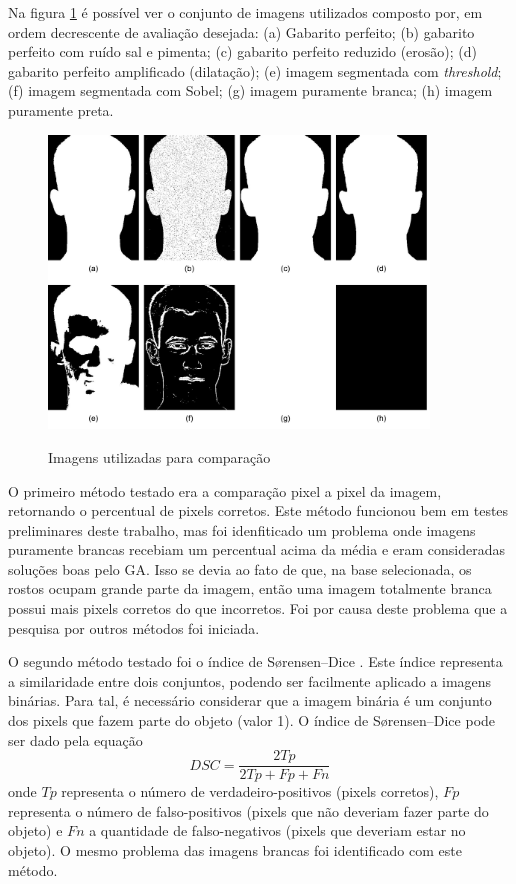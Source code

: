 \documentclass[12pt,oneside,a4paper,english,french,spanish,brazil,]{abntex2}
\begin{document}
Na figura \ref{fig:DES_Imagens_Teste} é possível ver o conjunto de imagens utilizados composto por, em ordem decrescente de avaliação desejada: (a) Gabarito perfeito; (b) gabarito perfeito com ruído sal e pimenta; (c) gabarito perfeito reduzido (erosão); (d) gabarito perfeito amplificado (dilatação); (e) imagem segmentada com \textit{threshold}; (f) imagem segmentada com Sobel; (g) imagem puramente branca; (h) imagem puramente preta.

\begin{figure}[ht]
\centering
\caption{Imagens utilizadas para comparação}
\includegraphics[width=0.9\textwidth]{imagens/DES_Imagens_Teste.pdf}
\sourceAuthor{}
\label{fig:DES_Imagens_Teste}
\end{figure}

O primeiro método testado era a comparação pixel a pixel da imagem, retornando o percentual de pixels corretos. Este método funcionou bem em testes preliminares deste trabalho, mas foi idenfiticado um problema onde imagens puramente brancas recebiam um percentual acima da média e eram consideradas soluções boas pelo GA. Isso se devia ao fato de que, na base selecionada, os rostos ocupam grande parte da imagem, então uma imagem totalmente branca possui mais pixels corretos do que incorretos. Foi por causa deste problema que a pesquisa por outros métodos foi iniciada.

O segundo método testado foi o índice de Sørensen–Dice \cite{sorensen:1948} \cite{dice:1945}. Este índice representa a similaridade entre dois conjuntos, podendo ser facilmente aplicado a imagens binárias. Para tal, é necessário considerar que a imagem binária é um conjunto dos pixels que fazem parte do objeto (valor 1). O índice de Sørensen–Dice pode ser dado pela equação \[DSC = \frac{2Tp}{2Tp + Fp + Fn}\] onde \(Tp\) representa o número de verdadeiro-positivos (pixels corretos), \(Fp\) representa o número de falso-positivos (pixels que não deveriam fazer parte do objeto) e \(Fn\) a quantidade de falso-negativos (pixels que deveriam estar no objeto). O mesmo problema das imagens brancas foi identificado com este método.
\end{document}
